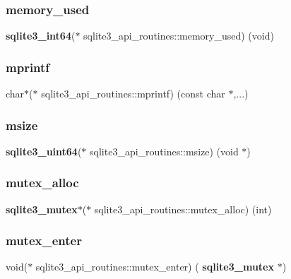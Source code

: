 \mbox{\label{structsqlite3__api__routines_ab97513cee1fdda32d881a206e6c89b4a}} 
\subsubsection{memory\_used}
{\footnotesize\ttfamily \textbf{ sqlite3\+\_\+int64}($\ast$ sqlite3\+\_\+api\+\_\+routines\+::memory\+\_\+used) (void)}

\mbox{\label{structsqlite3__api__routines_ac9a1fb416ae25745652d363a833ee977}} 
\subsubsection{mprintf}
{\footnotesize\ttfamily char$\ast$($\ast$ sqlite3\+\_\+api\+\_\+routines\+::mprintf) (const char $\ast$,...)}

\mbox{\label{structsqlite3__api__routines_a9cee16233cf2f31c23dbda654b1fdfc1}} 
\subsubsection{msize}
{\footnotesize\ttfamily \textbf{ sqlite3\+\_\+uint64}($\ast$ sqlite3\+\_\+api\+\_\+routines\+::msize) (void $\ast$)}

\mbox{\label{structsqlite3__api__routines_aafca5fdf6433287ca14458b3c495d342}} 
\subsubsection{mutex\_alloc}
{\footnotesize\ttfamily \textbf{ sqlite3\+\_\+mutex}$\ast$($\ast$ sqlite3\+\_\+api\+\_\+routines\+::mutex\+\_\+alloc) (int)}

\mbox{\label{structsqlite3__api__routines_afbf4a8e88080839fccf5dcd63ea2cee4}} 
\subsubsection{mutex\_enter}
{\footnotesize\ttfamily void($\ast$ sqlite3\+\_\+api\+\_\+routines\+::mutex\+\_\+enter) (\textbf{ sqlite3\+\_\+mutex} $\ast$)}

